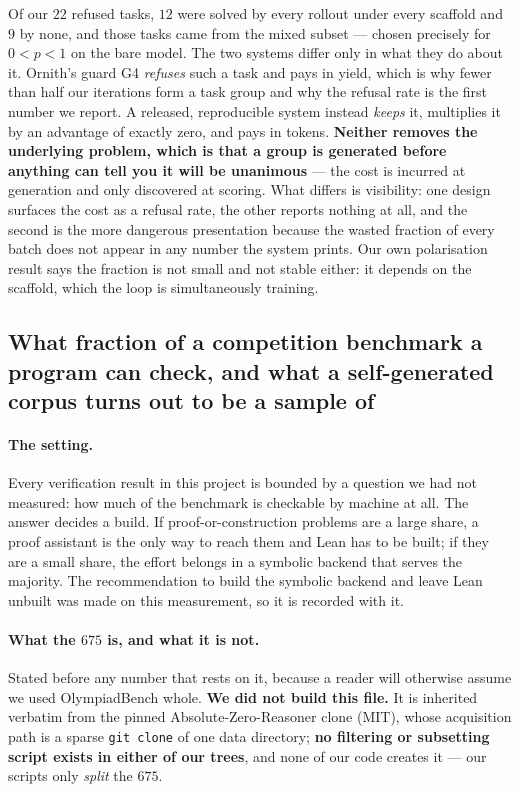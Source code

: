 Of our $22$ refused tasks, $12$ were solved by every rollout under every scaffold and $9$ by
none, and those tasks came from the mixed subset --- chosen precisely for $0 < p < 1$ on the
bare model. The two systems differ only in what they do about it. Ornith's guard G4
\emph{refuses} such a task and pays in yield, which is why fewer than half our iterations form
a task group and why the refusal rate is the first number we report. A released, reproducible
system instead \emph{keeps} it, multiplies it by an advantage of exactly zero, and pays in
tokens. \textbf{Neither removes the underlying problem, which is that a group is generated
before anything can tell you it will be unanimous} --- the cost is incurred at generation and
only discovered at scoring. What differs is visibility: one design surfaces the cost as a
refusal rate, the other reports nothing at all, and the second is the more dangerous
presentation because the wasted fraction of every batch does not appear in any number the
system prints. Our own polarisation result says the fraction is not small and not stable
either: it depends on the scaffold, which the loop is simultaneously training.

\subsection{What fraction of a competition benchmark a program can check, and what a
self-generated corpus turns out to be a sample of}
\label{sec:verifiablesubset}

\paragraph{The setting.} Every verification result in this project is bounded by a question we
had not measured: how much of the benchmark is checkable by machine at all. The answer decides
a build. If proof-or-construction problems are a large share, a proof assistant is the only way
to reach them and Lean has to be built; if they are a small share, the effort belongs in a
symbolic backend that serves the majority. The recommendation to build the symbolic backend
and leave Lean unbuilt was made on this measurement, so it is recorded with it.

\paragraph{What the $675$ is, and what it is not.} Stated before any number that rests on it,
because a reader will otherwise assume we used OlympiadBench whole. \textbf{We did not build
this file.} It is inherited verbatim from the pinned Absolute-Zero-Reasoner clone (MIT), whose
acquisition path is a sparse \texttt{git clone} of one data directory; \textbf{no filtering or
subsetting script exists in either of our trees}, and none of our code creates it --- our
scripts only \emph{split} the $675$.

